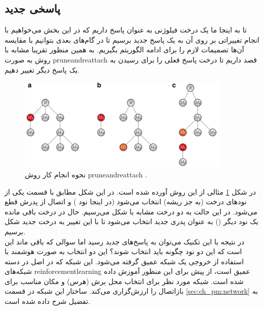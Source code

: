 \subsection{پاسخی جدید}
تا به اینجا ما یک درخت فیلوژنی به عنوان پاسخ داریم که در این بخش می‌خواهیم با انجام تغییراتی بر روی آن به یک پاسخ جدید برسیم تا در گام‌های بعدی بتوانیم با مقایسه آن‌ها تصمیمات لازم را برای ادامه الگوریتم بگیریم. به همین منظور تقریبا مشابه با روش \cite{davis2016computing} به صورت \gls{pruneandreattach} قصد داریم تا درخت پاسخ فعلی را برای رسیدن به یک پاسخ دیگر تغییر دهیم. 
\begin{figure}[!ht]
	\centering 
	\includegraphics[width=0.9\textwidth]{img/chaps/pm/pruneandreattach}
	\caption{نحوه انجام کار روش \gls{pruneandreattach} \cite{davis2016computing}.}    
	\label{fig:ch_pm:pruneandreattach}
\end{figure}
در شکل \ref{fig:ch_pm:pruneandreattach} مثالی از این روش آورده شده است. در این شکل مطابق با قسمت  یکی از نودهای درخت (به جز ریشه) انتخاب می‌شود (در اینجا نود ) و اتصال از پدرش قطع می‌شود. در این حالت به دو درخت مشابه با شکل  می‌رسیم. حال در درخت باقی مانده یک نود دیگر  () به عنوان پدری جدید انتخاب می‌شود تا با این تغییر به درخت جدید شکل  برسیم.
\\
در نتیجه با این تکنیک می‌توان به پاسخ‌های جدید رسید اما سوالی که باقی ماند این است که این دو نود چگونه باید انتخاب شوند؟ 
این دو انتخاب به صورت هوشمند با استفاده از خروجی یک شبکه عمیق گرفته می‌شود. این شبکه که در اصل در دسته شبکه‌های \gls{reinforcementlearning} عمیق است، از پیش برای این منظور آموزش داده شده‌ است.
%		
شبکه مورد نظر برای انتخاب محل برش (هرس) و مکان مناسب برای بازاتصال را ارزش‌گزاری می‌کند. ساختار این شبکه در قسمت \ref{sec:ch_pm:network} به تفضیل شرح داده شده است.

